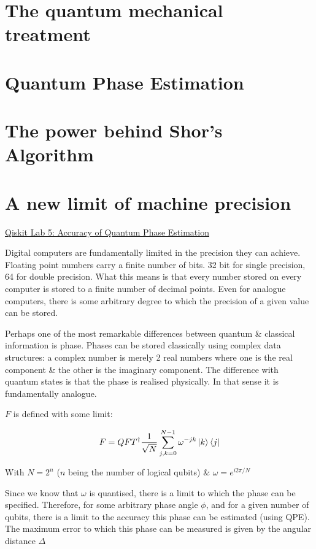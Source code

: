 \documentclass{book}
\begin{document}
\section{The quantum mechanical treatment}

\section{Quantum Phase Estimation}
\section{The power behind Shor's Algorithm}
\section{A new limit of machine precision}

\href{https://learn.qiskit.org/course/ch-labs/lab-5-accuracy-of-quantum-phase-estimation}{Qiskit Lab 5: Accuracy of Quantum Phase Estimation}

Digital computers are fundamentally limited in the precision they can achieve. Floating point numbers carry a finite number of bits. 32 bit for single precision, 64 for double precision. What this means is that every number stored on every computer is stored to a finite number of decimal points. Even for analogue computers, there is some arbitrary degree to which the precision of a given value can be stored. 

Perhaps one of the most remarkable differences between quantum \& classical information is phase. Phases can be stored classically using complex data structures: a complex number is merely 2 real numbers where one is the real component \& the other is the imaginary component. The difference with quantum states is that the phase is realised physically. In that sense it is fundamentally analogue. 

$F$ is defined with some limit:

$$ F = QFT^\dagger \frac{1}{\sqrt{N}}\sum_{j,k = 0}^{N-1} \omega^{-jk}\ket{k}\bra{j}$$

With $ N = 2^n$ ($n$ being the number of logical qubits) \& $\omega = e^{i2\pi/N}$

Since we know that $\omega$ is quantised, there is a limit to which the phase can be specified. Therefore, for some arbitrary phase angle $\phi$, and for a given number of qubits, there is a limit to the accuracy this phase can be estimated (using QPE). The maximum error to which this phase can be measured is given by the angular distance $\Delta$
\end{document}
